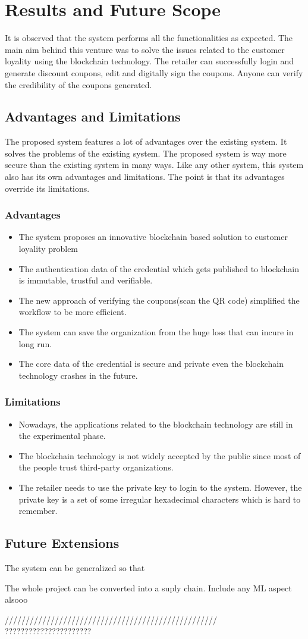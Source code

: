 \chapter{Results and Future Scope}
\par
It is observed that the system performs all the functionalities as expected. The main aim behind this venture was to solve the issues related to the customer loyality using the blockchain technology. The retailer can  successfully login and generate discount coupons, edit and digitally sign the coupons. Anyone can verify the credibility  of the coupons generated.
\section{Advantages and Limitations}
The proposed system features a lot of advantages over the existing system. It solves the problems of the existing system. The proposed system is way more secure than the existing system in many ways. Like any other system, this system also has its own advantages and limitations. The point is that its advantages override its limitations.
\subsection{Advantages}
\begin{itemize}
\item The system proposes an innovative blockchain based solution to customer loyality problem 
\item The authentication data of the credential which gets published to blockchain is immutable, trustful and verifiable.
\item The new approach of verifying the coupons(scan the QR code) simplified the workflow to be more efficient.
\item The system can save the organization from the huge loss that can incure in long run.
\item The core data of the credential is secure and private even the blockchain technology crashes in the future.

\end{itemize}
\subsection{Limitations}
\begin{itemize}
\item Nowadays, the applications related to the blockchain technology are still in the experimental phase.
\item The blockchain technology is not widely accepted by the public since most of the people trust third-party organizations.
\item The retailer needs to use the private key to login to the system. However, the private key is a set of some irregular hexadecimal characters which is hard to remember.
\end{itemize}
\section{Future Extensions}
\par
The system can be generalized so that 

The whole project can be converted into a suply chain.
Include any ML aspect alsooo
\par

///////////////////////////////////////////////////
??????????????????????